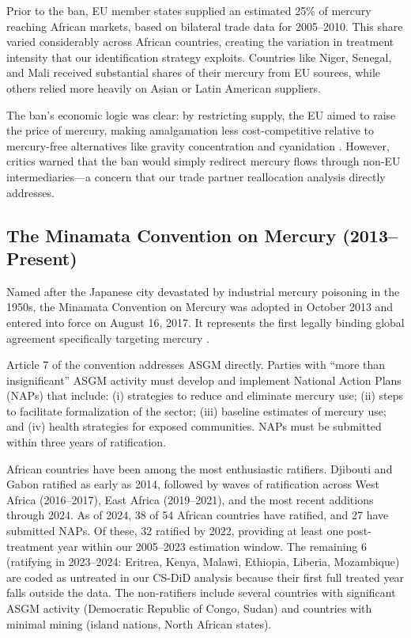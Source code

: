 \documentclass[12pt]{article}
\begin{document}
Prior to the ban, EU member states supplied an estimated 25\% of mercury reaching African markets, based on bilateral trade data for 2005--2010. This share varied considerably across African countries, creating the variation in treatment intensity that our identification strategy exploits. Countries like Niger, Senegal, and Mali received substantial shares of their mercury from EU sources, while others relied more heavily on Asian or Latin American suppliers.

The ban's economic logic was clear: by restricting supply, the EU aimed to raise the price of mercury, making amalgamation less cost-competitive relative to mercury-free alternatives like gravity concentration and cyanidation \citep{spiegel2009reducing}. However, critics warned that the ban would simply redirect mercury flows through non-EU intermediaries---a concern that our trade partner reallocation analysis directly addresses.

\subsection{The Minamata Convention on Mercury (2013--Present)}

Named after the Japanese city devastated by industrial mercury poisoning in the 1950s, the Minamata Convention on Mercury was adopted in October 2013 and entered into force on August 16, 2017. It represents the first legally binding global agreement specifically targeting mercury \citep{cossart2019minamata}.

Article 7 of the convention addresses ASGM directly. Parties with ``more than insignificant'' ASGM activity must develop and implement National Action Plans (NAPs) that include: (i) strategies to reduce and eliminate mercury use; (ii) steps to facilitate formalization of the sector; (iii) baseline estimates of mercury use; and (iv) health strategies for exposed communities. NAPs must be submitted within three years of ratification.

African countries have been among the most enthusiastic ratifiers. Djibouti and Gabon ratified as early as 2014, followed by waves of ratification across West Africa (2016--2017), East Africa (2019--2021), and the most recent additions through 2024. As of 2024, 38 of 54 African countries have ratified, and 27 have submitted NAPs. Of these, 32 ratified by 2022, providing at least one post-treatment year within our 2005--2023 estimation window. The remaining 6 (ratifying in 2023--2024: Eritrea, Kenya, Malawi, Ethiopia, Liberia, Mozambique) are coded as untreated in our CS-DiD analysis because their first full treated year falls outside the data. The non-ratifiers include several countries with significant ASGM activity (Democratic Republic of Congo, Sudan) and countries with minimal mining (island nations, North African states).
\end{document}
